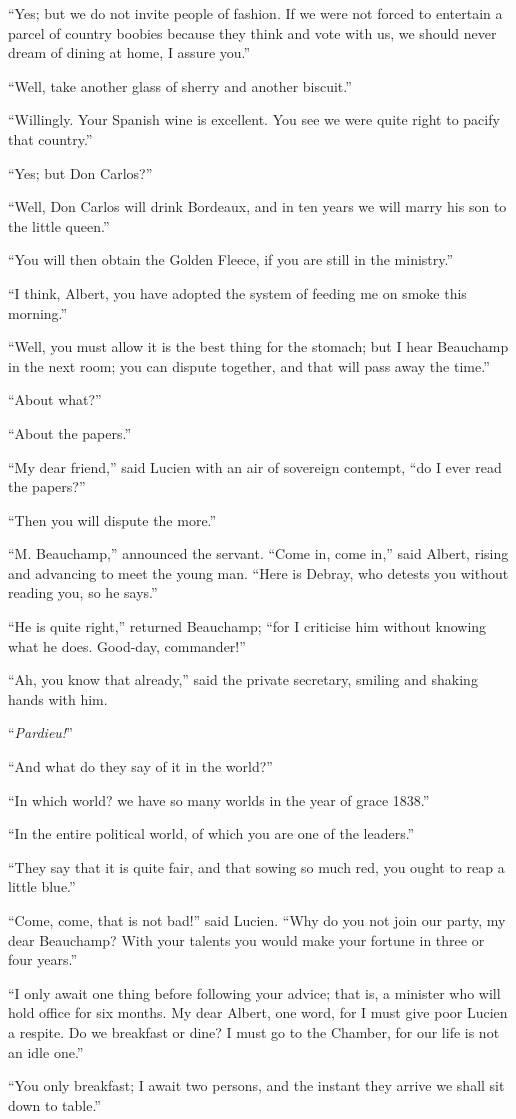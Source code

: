 “Yes; but we do not invite people of fashion. If we were not forced to
entertain a parcel of country boobies because they think and vote with
us, we should never dream of dining at home, I assure you.”

“Well, take another glass of sherry and another biscuit.”

“Willingly. Your Spanish wine is excellent. You see we were quite right
to pacify that country.”

“Yes; but Don Carlos?”

“Well, Don Carlos will drink Bordeaux, and in ten years we will marry
his son to the little queen.”

“You will then obtain the Golden Fleece, if you are still in the
ministry.”

“I think, Albert, you have adopted the system of feeding me on smoke
this morning.”

“Well, you must allow it is the best thing for the stomach; but I hear
Beauchamp in the next room; you can dispute together, and that will
pass away the time.”

“About what?”

“About the papers.”

“My dear friend,” said Lucien with an air of sovereign contempt, “do I
ever read the papers?”

“Then you will dispute the more.”

“M. Beauchamp,” announced the servant. “Come in, come in,” said Albert,
rising and advancing to meet the young man. “Here is Debray, who
detests you without reading you, so he says.”

“He is quite right,” returned Beauchamp; “for I criticise him without
knowing what he does. Good-day, commander!”

“Ah, you know that already,” said the private secretary, smiling and
shaking hands with him.

“\textit{Pardieu!}”

“And what do they say of it in the world?”

“In which world? we have so many worlds in the year of grace 1838.”

“In the entire political world, of which you are one of the leaders.”

“They say that it is quite fair, and that sowing so much red, you ought
to reap a little blue.”

“Come, come, that is not bad!” said Lucien. “Why do you not join our
party, my dear Beauchamp? With your talents you would make your fortune
in three or four years.”

“I only await one thing before following your advice; that is, a
minister who will hold office for six months. My dear Albert, one word,
for I must give poor Lucien a respite. Do we breakfast or dine? I must
go to the Chamber, for our life is not an idle one.”

“You only breakfast; I await two persons, and the instant they arrive
we shall sit down to table.”
